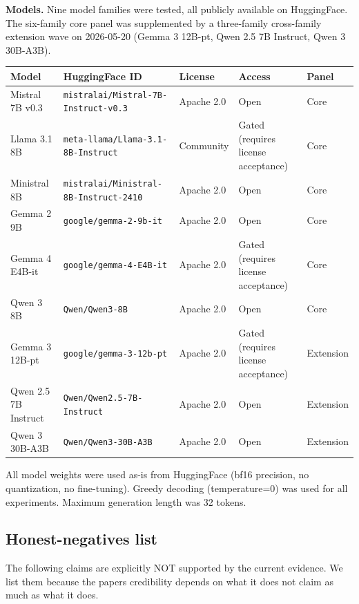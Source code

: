 \documentclass[10pt]{article}
\newcounter{none} %
\begin{document}
\textbf{Models.} Nine model families were tested, all publicly available
on HuggingFace. The six-family core panel was supplemented by a
three-family cross-family extension wave on 2026-05-20 (Gemma 3 12B-pt,
Qwen 2.5 7B Instruct, Qwen 3 30B-A3B).

{\def\LTcaptype{none} %
{\scriptsize\setlength{\tabcolsep}{2pt}\renewcommand{\arraystretch}{0.92} \begin{longtable}[]{@{}lllll@{}}
\toprule\noalign{}
Model & HuggingFace ID & License & Access & Panel \\
\midrule\noalign{}
\endhead
\bottomrule\noalign{}
\endlastfoot
Mistral 7B v0.3 & \texttt{mistralai/\allowbreak{}Mistral-7B-Instruct-v0.\allowbreak{}3} & Apache
2.0 & Open & Core \\
Llama 3.1 8B & \texttt{meta-llama/\allowbreak{}Llama-3.\allowbreak{}1-8B-Instruct} & Community &
Gated (requires license acceptance) & Core \\
Ministral 8B & \texttt{mistralai/\allowbreak{}Ministral-8B-Instruct-2410} & Apache
2.0 & Open & Core \\
Gemma 2 9B & \texttt{google/gemma-2-9b-it} & Apache 2.0 & Open & Core \\
Gemma 4 E4B-it & \texttt{google/gemma-4-E4B-it} & Apache 2.0 & Gated
(requires license acceptance) & Core \\
Qwen 3 8B & \texttt{Qwen/Qwen3-8B} & Apache 2.0 & Open & Core \\
Gemma 3 12B-pt & \texttt{google/gemma-3-12b-pt} & Apache 2.0 & Gated
(requires license acceptance) & Extension \\
Qwen 2.5 7B Instruct & \texttt{Qwen/Qwen2.5-7B-Instruct} & Apache 2.0 &
Open & Extension \\
Qwen 3 30B-A3B & \texttt{Qwen/Qwen3-30B-A3B} & Apache 2.0 & Open &
Extension \\
\end{longtable}}
}

All model weights were used as-is from HuggingFace (bf16 precision, no
quantization, no fine-tuning). Greedy decoding (temperature=0) was used
for all experiments. Maximum generation length was 32 tokens.

\subsection{Honest-negatives list}\label{a7-honest-negatives-list}

The following claims are explicitly NOT supported by the current
evidence. We list them because the paper\textquotesingle s credibility
depends on what it does not claim as much as what it does.
\end{document}
